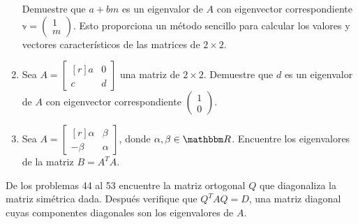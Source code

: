 \begin{enumerate}[resume]
    Demuestre que $a+b m$ es un eigenvalor de $A$ con eigenvector correspondiente $\mathbb{v}=\begin{pmatrix*}1 \\ m\end{pmatrix*}$. Esto proporciona un método sencillo para calcular los valores y vectores característicos de las matrices de $2 \times 2$.
    \item Sea $A=\begin{bmatrix*}[r]a & 0 \\ c & d\end{bmatrix*}$ una matriz de $2 \times 2$. Demuestre que $d$ es un eigenvalor de $A$ con eigenvector correspondiente $\begin{pmatrix*}1 \\ 0\end{pmatrix*}$.\newpage
    \item Sea $A=\begin{bmatrix*}[r]\alpha & \beta \\ -\beta & \alpha\end{bmatrix*}$, donde $\alpha, \beta \in \RR$. Encuentre los eigenvalores de la matriz $B=A^{T} A$.
\end{enumerate}
De los problemas 44 al 53 encuentre la matriz ortogonal $Q$ que diagonaliza la matriz simétrica dada. Después verifique que $Q^{T} A Q=D$, una matriz diagonal cuyas componentes diagonales son los eigenvalores de $A$.
